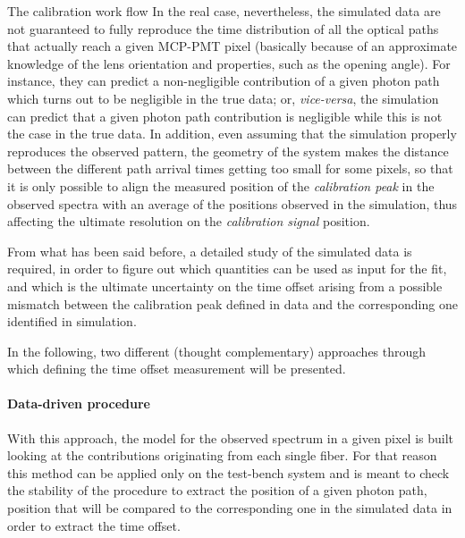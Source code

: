 \documentclass[a4paper,11pt]{article}
\begin{document}
\begin{subsection}{The calibration work flow}
In the real case, nevertheless, the simulated data are not guaranteed to fully reproduce the time distribution of all the optical paths that actually reach a given MCP-PMT pixel (basically because of an approximate knowledge of the lens orientation and properties, such as the opening angle). For instance, they can predict a non-negligible contribution of a given photon path which turns out to be negligible in the true data; or, {\itshape vice-versa}, the simulation can predict that a given photon path contribution is negligible while this is not the case in the true data. In addition, even assuming that the simulation properly reproduces the observed pattern, the geometry of the system makes the distance between the different path arrival times getting too small for some pixels, so that it is only possible to align the measured position of the {\itshape calibration peak} in the observed spectra with an average of the positions observed in the simulation, thus affecting the ultimate resolution on the {\itshape calibration signal} position. 

From what has been said before, a detailed study of the simulated data is required, in order to figure out which quantities can be used as input for the fit, and which is the ultimate uncertainty on the time offset arising from a possible mismatch between the calibration peak defined in data and the corresponding one identified in simulation.

In the following, two different (thought complementary) approaches through which defining the time offset measurement will be presented.

\paragraph{Data-driven procedure} With this approach, the model for the observed spectrum in a given pixel is built looking at the contributions originating from each single fiber. For that reason this method can be applied only on the test-bench system and is meant to check the stability of the procedure to extract the position of a given photon path, position that will be compared to the corresponding one in the simulated data in order to extract the time offset. 


\end{subsection}
\end{document}
